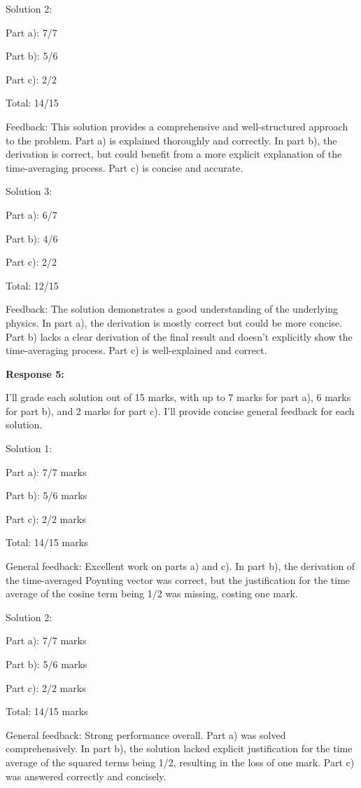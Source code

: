\documentclass[a4paper,11pt]{article}
\begin{document}
Solution 2:

Part a): 7/7

Part b): 5/6

Part c): 2/2

Total: 14/15

Feedback: This solution provides a comprehensive and well-structured approach to the problem. Part a) is explained thoroughly and correctly. In part b), the derivation is correct, but could benefit from a more explicit explanation of the time-averaging process. Part c) is concise and accurate.

Solution 3:

Part a): 6/7

Part b): 4/6

Part c): 2/2

Total: 12/15

Feedback: The solution demonstrates a good understanding of the underlying physics. In part a), the derivation is mostly correct but could be more concise. Part b) lacks a clear derivation of the final result and doesn't explicitly show the time-averaging process. Part c) is well-explained and correct.

\bigskip
\textbf{Response 5:}

I'll grade each solution out of 15 marks, with up to 7 marks for part a), 6 marks for part b), and 2 marks for part c). I'll provide concise general feedback for each solution.

Solution 1:

Part a): 7/7 marks

Part b): 5/6 marks

Part c): 2/2 marks

Total: 14/15 marks

General feedback: Excellent work on parts a) and c). In part b), the derivation of the time-averaged Poynting vector was correct, but the justification for the time average of the cosine term being 1/2 was missing, costing one mark.

Solution 2:

Part a): 7/7 marks

Part b): 5/6 marks

Part c): 2/2 marks

Total: 14/15 marks

General feedback: Strong performance overall. Part a) was solved comprehensively. In part b), the solution lacked explicit justification for the time average of the squared terms being 1/2, resulting in the loss of one mark. Part c) was answered correctly and concisely.
\end{document}
